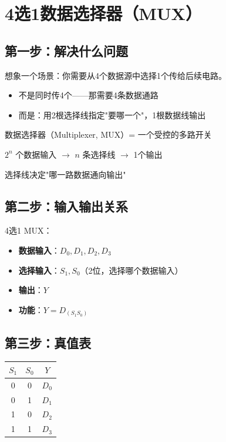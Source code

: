 \chapter{4选1数据选择器（MUX）}

\section{第一步：解决什么问题}

想象一个场景：你需要从4个数据源中选择1个传给后续电路。

\begin{itemize}
  \item 不是同时传4个——那需要4条数据通路
  \item 而是：用2根选择线指定"要哪一个"，1根数据线输出
\end{itemize}

\begin{keypoint}[MUX的本质]
数据选择器（Multiplexer, MUX）= 一个受控的多路开关

$2^n$ 个数据输入 $\to$ $n$ 条选择线 $\to$ 1个输出

选择线决定"哪一路数据通向输出"
\end{keypoint}

\section{第二步：输入输出关系}

4选1 MUX：

\begin{itemize}
  \item \textbf{数据输入}：$D_0, D_1, D_2, D_3$
  \item \textbf{选择输入}：$S_1, S_0$（2位，选择哪个数据输入）
  \item \textbf{输出}：$Y$
  \item \textbf{功能}：$Y = D_{(S_1 S_0)}$
\end{itemize}

\section{第三步：真值表}

\begin{center}
\begin{tabular}{|c|c||c|}
\hline
$S_1$ & $S_0$ & $Y$ \\
\hline
0 & 0 & $D_0$ \\
0 & 1 & $D_1$ \\
1 & 0 & $D_2$ \\
1 & 1 & $D_3$ \\
\hline
\end{tabular}
\end{center}

